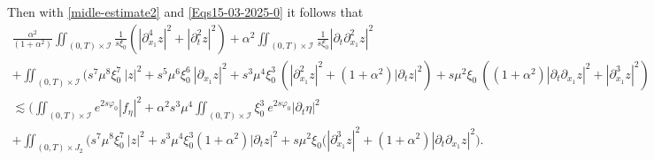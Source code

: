 \documentclass[a4paper, 12pt]{article}
\theoremstyle{plain}
\theoremstyle{definition}
\numberwithin{theorem}{section}
\numberwithin{equation}{section}
\begin{document}
{Then with \eqref{midle-estimate2} and \eqref{Eqs15-03-2025-0} it follows that
\begin{multline}\label{Eqs15-03-2025}
\frac{\alpha^2}{(1+\alpha^2)}\iint_{(0,T)\times\mathcal{I}}\frac{1}{s\xi_0}(|\partial^4_{x_1}z|^2+|\partial^2_tz|^2)+\alpha^2\iint_{(0,T)\times\mathcal{I}}\frac{1}{s\xi_0}|\partial_t\partial^2_{x_1}z|^2\\
+ \iint_{(0,T)\times\mathcal{I}} (s^7\mu^8\xi_0^7~|z|^2+s^5\mu^6\xi_0^6~|\partial_{x_1}z|^2+s^3\mu^4\xi_0^3~(|\partial^2_{x_1}z|^2+(1+\alpha^2)|\partial_{t}z|^2)+s\mu^2\xi_0~((1+\alpha^2)|\partial_t\partial_{x_1}z|^2+|\partial_{x_1}^3z|^2)\\
\lesssim \Big(\iint_{(0,T)\times\mathcal{I}}e^{2s\varphi_0}|f_\eta|^2+\alpha^2s^3\mu^4\iint_{(0,T)\times\mathcal{I}}\xi_0^3~e^{2s\varphi_0}|\partial_t \eta|^2\\
+\iint_{(0,T)\times J_2}\Big(s^7\mu^8\xi^7_0~|z|^2+s^3\mu^4\xi_0^3 (1+\alpha^2)|\partial_tz|^2+s\mu^2\xi_0(|\partial^3_{x_1}z|^2+(1+\alpha^2)|\partial_t\partial_{x_1}z|^2\Big).
\end{multline}
}
\end{document}
